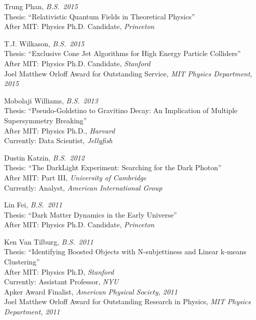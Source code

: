 \item Trung Phan, \emph{B.S.~2015}
\\ \sh Thesis: ``Relativistic Quantum Fields in Theoretical Physics''
\\ \sh After MIT: Physics Ph.D. Candidate, \emph{Princeton}

\item T.J. Wilkason, \emph{B.S.~2015}
\\ \sh Thesis: ``Exclusive Cone Jet Algorithms for High Energy Particle Colliders''
\\ \sh After MIT: Physics Ph.D. Candidate, \emph{Stanford}
\\ \sh Joel Matthew Orloff Award for Outstanding Service, \emph{MIT Physics Department, 2015}

\item Mobolaji Williams, \emph{B.S.~2013}
\\ \sh Thesis: ``Pseudo-Goldstino to Gravitino Decay: An Implication of Multiple Supersymmetry Breaking''
\\ \sh After MIT: Physics Ph.D., \emph{Harvard}
\\ \sh Currently: Data Scientist, \emph{Jellyfish}

\item Dustin Katzin, \emph{B.S.~2012}
\\ \sh Thesis: ``The DarkLight Experiment: Searching for the Dark Photon''
\\ \sh After MIT: Part III, \emph{University of Cambridge}
\\ \sh Currently: Analyst, \emph{American International Group}

\item Lin Fei, \emph{B.S.~2011}
\\ \sh Thesis: ``Dark Matter Dynamics in the Early Universe''
\\ \sh After MIT: Physics Ph.D. Candidate, \emph{Princeton}

\item Ken Van Tilburg, \emph{B.S.~2011}
\\ \sh Thesis: ``Identifying Boosted Objects with N-subjettiness and Linear k-means Clustering''
\\ \sh After MIT: Physics Ph.D, \emph{Stanford}
\\ \sh Currently: Assistant Professor, \emph{NYU}
\\ \sh Apker Award Finalist, \emph{American Physical Society, 2011}
\\ \sh Joel Matthew Orloff Award for Outstanding Research in Physics, \emph{MIT Physics Department, 2011}

\el
